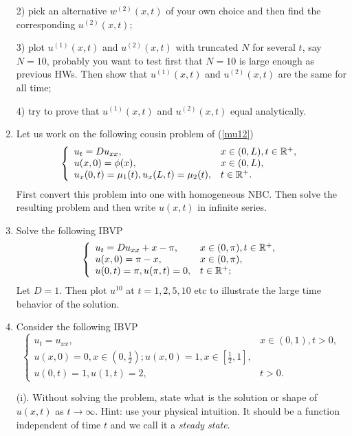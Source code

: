 \documentclass[6pt]{article}
\numberwithin{equation}{section}
\def\mathbb{\Bbb}
\begin{document}
\begin{enumerate}
2) pick an alternative $w^{(2)}(x,t)$ of your own choice and then find the corresponding $u^{(2)}(x,t)$;

3) plot $u^{(1)}(x,t)$ and $u^{(2)}(x,t)$ with truncated $N$ for several $t$, say $N=10$, probably you want to test first that $N=10$ is large enough as previous HWs.  Then show that $u^{(1)}(x,t)$ and $u^{(2)}(x,t)$ are the same for all time;

4) try to prove that $u^{(1)}(x,t)$ and $u^{(2)}(x,t)$ equal analytically.

\item Let us work on the following cousin problem of (\ref{mu12})
\begin{equation}
\left\{
\begin{array}{ll}
u_t=Du_{xx},& x\in(0,L),t\in\mathbb R^+,\\
u(x,0)=\phi(x),&x\in(0,L),\\
u_x(0,t)=\mu_1(t), u_x(L,t)=\mu_2(t), &t\in\mathbb R^+.
\end{array}
\right.
\end{equation}
First convert this problem into one with homogeneous NBC.  Then solve the resulting problem and then write $u(x,t)$ in infinite series.

\item Solve the following IBVP
\begin{equation}\label{4}
\left\{
\begin{array}{ll}
u_t=Du_{xx}+x-\pi,& x\in(0,\pi),t\in\mathbb R^+,\\
u(x,0)=\pi-x,&x\in(0,\pi),\\
u(0,t)=\pi, u(\pi,t)=0, &t\in\mathbb R^+;
\end{array}
\right.
\end{equation}
Let $D=1$.  Then plot $u^{10}$ at $t=1,2,5,10$ etc to illustrate the large time behavior of the solution.

\item Consider the following IBVP
\begin{equation}\label{53}
\left\{
\begin{array}{ll}
u_t=u_{xx},& x\in(0,1),t>0,\\
u(x,0)=0, x\in(0,\frac{1}{2}); u(x,0)=1, x\in[\frac{1}{2},1],\\
u(0,t)=1, u(1,t)=2, &t>0.
\end{array}
\right.
\end{equation}

(i).  Without solving the problem, state what is the solution or shape of $u(x,t)$ as $t\rightarrow \infty$.  Hint: use your physical intuition.  It should be a function independent of time $t$ and we call it a \emph{steady state}.


\end{enumerate}
\end{document}
